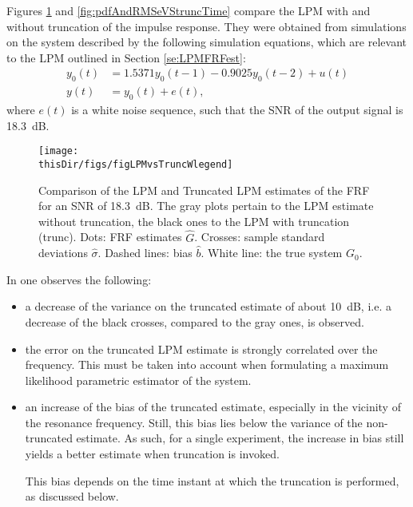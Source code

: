Figures \ref{figLPMvsTrunc} and \ref{fig:pdfAndRMSeVStruncTime} compare the LPM with and without truncation of the impulse response. They were obtained from simulations on 
the system described by the following simulation equations, which are relevant to the LPM outlined in Section \ref{se:LPMFRFest}:
\begin{subequations}
\label{eq:systemSimulations}
\begin{align}
y_0(t)  &= 1.5371y_0(t-1)    -0.9025y_0(t-2) + u(t)
\\
y(t) &= y_0(t) + e(t),
\end{align}
\end{subequations}
where $e(t)$ is a white noise sequence, such that the SNR of the output signal is 18.3~dB.


\begin{figure}[tbh] %
\centering


\texttt{[image: \\thisDir/figs/figLPMvsTruncWlegend]}

\caption{Comparison of the LPM and Truncated LPM estimates of the FRF for an SNR of 18.3~dB. The gray plots pertain to the LPM estimate without truncation, the black ones to the LPM with truncation (trunc). Dots: FRF estimates $\hat{G}$. Crosses: sample standard deviations $\hat{\sigma}$. Dashed lines: bias $\hat{b}$. White line: the true system $G_0$.}
\label{figLPMvsTrunc}
\end{figure}





In  one observes the following:
\begin{itemize}
\item
a decrease of the variance on the truncated estimate of about 10~dB,  i.e. a decrease of the black crosses, compared to the gray ones, is observed. %

\item 
the error on the truncated LPM estimate is strongly correlated over the frequency. This must be taken into account when formulating a maximum likelihood parametric estimator of the system.	

\item
an increase of the bias of the truncated estimate, especially in the vicinity of the resonance frequency. Still, this bias lies below the variance of the non-truncated estimate. As such, for a single experiment, the increase in bias still yields a better estimate when truncation is invoked. %

This bias depends on the time instant at which the truncation is performed, as discussed below.

\end{itemize}

